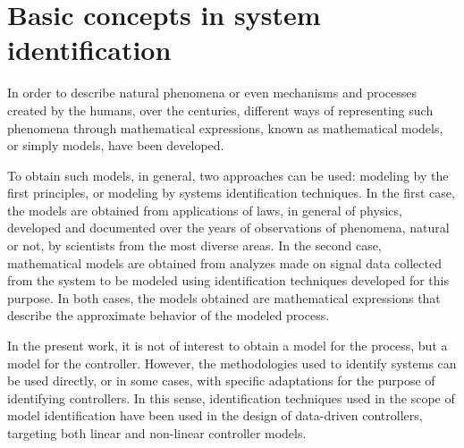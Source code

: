 
\chapter{Basic concepts in system identification}
\label{cap:cap2} \vspace{-1cm}

%
In order to describe natural phenomena or even mechanisms and processes created by the humans, over the centuries, different ways of representing such phenomena through mathematical expressions, known as mathematical models, or simply models, have been developed.

To obtain such models, in general, two approaches can be used: modeling by the first principles, or modeling by systems identification techniques. In the first case, the models are obtained from applications of laws, in general of physics, developed and documented over the years of observations of phenomena, natural or not, by scientists from the most diverse areas. In the second case, mathematical models are obtained from analyzes made on signal data collected from the system to be modeled using identification techniques developed for this purpose. In both cases, the models obtained are mathematical expressions that describe the approximate behavior of the modeled process.

In the present work, it is not of interest to obtain a model for the process, but a model for the controller. However, the methodologies used to identify systems can be used directly, or in some cases, with specific adaptations for the purpose of identifying controllers. In this sense, identification techniques used in the scope of model identification have been used in the design of data-driven controllers, targeting both linear \citep{campi2002} and non-linear \citep{campi2006} controller models.


